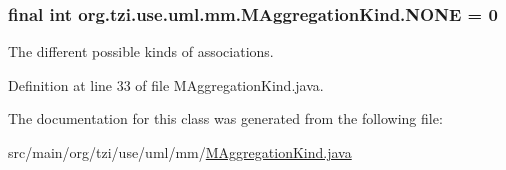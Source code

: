 \hypertarget{classorg_1_1tzi_1_1use_1_1uml_1_1mm_1_1_m_aggregation_kind_ae36fcdc17fcf5c81d423694e8d4d66a4}{
\subsubsection[{N\-O\-N\-E}]{\setlength{\rightskip}{0pt plus 5cm}final int org.\-tzi.\-use.\-uml.\-mm.\-M\-Aggregation\-Kind.\-N\-O\-N\-E = 0\hspace{0.3cm}{\ttfamily [static]}}}\label{classorg_1_1tzi_1_1use_1_1uml_1_1mm_1_1_m_aggregation_kind_ae36fcdc17fcf5c81d423694e8d4d66a4}
The different possible kinds of associations. 

Definition at line 33 of file M\-Aggregation\-Kind.\-java.



The documentation for this class was generated from the following file\-:\begin{DoxyCompactItemize}
\item 
src/main/org/tzi/use/uml/mm/\hyperlink{_m_aggregation_kind_8java}{M\-Aggregation\-Kind.\-java}\end{DoxyCompactItemize}
